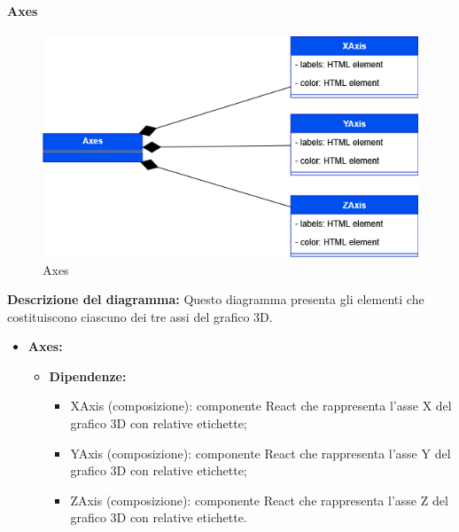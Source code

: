 \paragraph{Axes}
\begin{figure}[h!] \centering
    \includegraphics[scale=0.45]{template/images/uml_front/ui/axes.png}
    \caption{Axes}
\end{figure}
\textbf{Descrizione del diagramma:}
Questo diagramma presenta gli elementi che costituiscono ciascuno dei tre assi del grafico 3D.
\begin{itemize}
    \item \textbf{Axes:}
          \begin{itemize}
              \item \textbf{Dipendenze:}
                    \begin{itemize}
                        \item XAxis (composizione): componente React che rappresenta l'asse X del grafico 3D
                              con relative etichette;
                        \item YAxis (composizione): componente React che rappresenta l'asse Y del grafico 3D
                              con relative etichette;
                        \item ZAxis (composizione): componente React che rappresenta l'asse Z del grafico 3D
                              con relative etichette.
                    \end{itemize}
          \end{itemize}
\end{itemize}